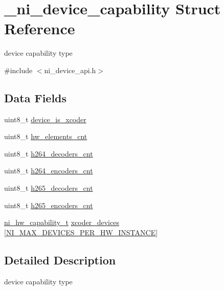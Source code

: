 \hypertarget{struct__ni__device__capability}{}\section{\+\_\+ni\+\_\+device\+\_\+capability Struct Reference}
\label{struct__ni__device__capability}


device capability type  




{\ttfamily \#include $<$ni\+\_\+device\+\_\+api.\+h$>$}

\subsection*{Data Fields}
\begin{DoxyCompactItemize}
\item 
uint8\+\_\+t \mbox{\hyperlink{struct__ni__device__capability_ad4fed7b2552adb93897ae08ecd3db72f}{device\+\_\+is\+\_\+xcoder}}
\item 
uint8\+\_\+t \mbox{\hyperlink{struct__ni__device__capability_a96e50bfe16a8a58c521d70354c3dc720}{hw\+\_\+elements\+\_\+cnt}}
\item 
uint8\+\_\+t \mbox{\hyperlink{struct__ni__device__capability_acd5fa27464a65705195bcc2cc65f1c41}{h264\+\_\+decoders\+\_\+cnt}}
\item 
uint8\+\_\+t \mbox{\hyperlink{struct__ni__device__capability_a30c36f87b97c3bbbac753bde6642b8c2}{h264\+\_\+encoders\+\_\+cnt}}
\item 
uint8\+\_\+t \mbox{\hyperlink{struct__ni__device__capability_ac9a623bf526e344c8014306176da5d71}{h265\+\_\+decoders\+\_\+cnt}}
\item 
uint8\+\_\+t \mbox{\hyperlink{struct__ni__device__capability_a0256a689309cbc7d6863b44c45bbbca1}{h265\+\_\+encoders\+\_\+cnt}}
\item 
\mbox{\hyperlink{ni__device__api_8h_aa613b88d7181b67f6fabca9f0a1ea37c}{ni\+\_\+hw\+\_\+capability\+\_\+t}} \mbox{\hyperlink{struct__ni__device__capability_a819804d2d3d3fb563024e306bbeedce6}{xcoder\+\_\+devices}} \mbox{[}\mbox{\hyperlink{ni__device__api_8h_a71825b287385d9e2120ae13083aad09d}{N\+I\+\_\+\+M\+A\+X\+\_\+\+D\+E\+V\+I\+C\+E\+S\+\_\+\+P\+E\+R\+\_\+\+H\+W\+\_\+\+I\+N\+S\+T\+A\+N\+CE}}\mbox{]}
\end{DoxyCompactItemize}


\subsection{Detailed Description}
device capability type 


